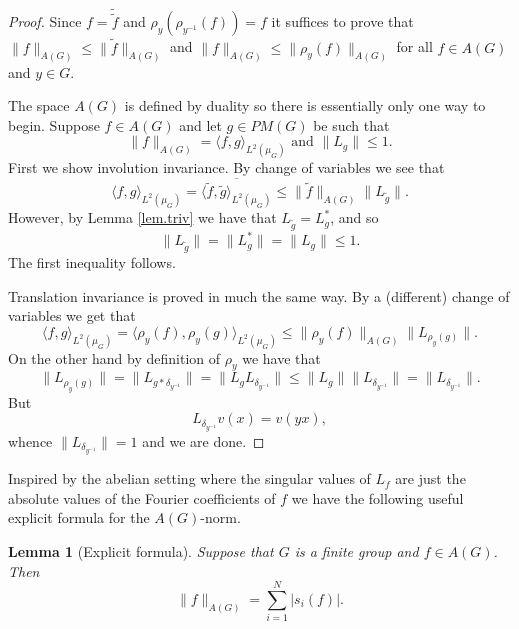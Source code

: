 \documentclass[12pt]{amsart}
\numberwithin{equation}{section}
\theoremstyle{plain}
\newtheorem{lemma}[subsection]{Lemma}
\theoremstyle{definition}
\renewcommand{\leq}{\leqslant}
\begin{document}
\begin{proof} 
Since $f=\tilde{\tilde{f}}$ and $\rho_y(\rho_{y^{-1}}(f)) = f$ it suffices to prove that $\|f\|_{A(G)} \leq \|\tilde{f}\|_{A(G)}$ and $\|f\|_{A(G)} \leq \|\rho_y(f)\|_{A(G)}$ for all $f \in A(G)$ and $y \in G$.

The space $A(G)$ is defined by duality so there is essentially only one way to begin.  Suppose $f \in A(G)$ and let $g \in PM(G)$ be such that 
\begin{equation*}
\|f\|_{A(G)} = \langle f,g\rangle_{L^2(\mu_G)} \textrm{ and } \|L_g\| \leq 1.
\end{equation*}
First we show involution invariance. By change of variables we see that
\begin{equation*}
\langle f,g\rangle_{L^2(\mu_G)} = \overline{\langle \tilde{f},\tilde{g}\rangle_{L^2(\mu_G)}} \leq \|\tilde{f}\|_{A(G)}\|L_{\tilde{g}}\|.
\end{equation*}
However, by Lemma \ref{lem.triv} we have that $L_{\tilde{g}}=L_g^*$, and so
\begin{equation*}
\|L_{\tilde{g}}\| = \|L_g^*\|=\|L_g\|\leq 1.
\end{equation*}
The first inequality follows.

Translation invariance is proved in much the same way.  By a (different) change of variables we get that
\begin{equation*}
\langle f,g\rangle_{L^2(\mu_G)} = \langle \rho_y(f),\rho_y(g)\rangle_{L^2(\mu_G)} \leq \|\rho_y(f)\|_{A(G)}\|L_{\rho_y(g)}\|.
\end{equation*}
On the other hand by definition of $\rho_y$ we have that
\begin{equation*}
\|L_{\rho_y(g)}\| = \|L_{g \ast \delta_{y^{-1}}}\| = \|L_g L_{\delta_{y^{-1}}}\| \leq \|L_g\| \|L_{\delta_{y^{-1}}}\| =\|L_{\delta_{y^{-1}}}\|. 
\end{equation*}
But
\begin{equation*}
L_{\delta_{y^{-1}}}v(x) = v(yx),
\end{equation*}
whence $\|L_{\delta_{y^{-1}}}\| = 1$ and we are done.
\end{proof}
Inspired by the abelian setting where the singular values of $L_f$ are just the absolute values of the Fourier coefficients of $f$ we have the following useful explicit formula for the $A(G)$-norm.
\begin{lemma}[Explicit formula]\label{lem.algnormexp}
Suppose that $G$ is a finite group and $f \in A(G)$. Then
\begin{equation*}
\|f\|_{A(G)} = \sum_{i=1}^N{|s_i(f)|}.
\end{equation*}
\end{lemma}
\end{document}
